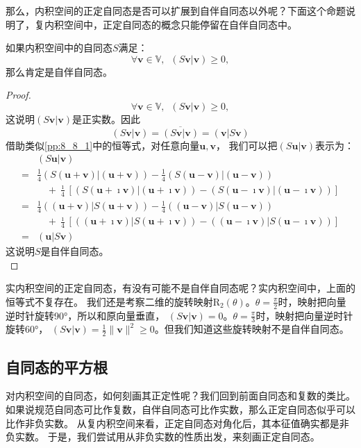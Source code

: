 \documentclass[12pt,UTF8,fontset=none]{ctexbook}
\begin{document}
那么，内积空间的正定自同态是否可以扩展到自伴自同态以外呢？下面这个命题说明了，复内积空间中，正定自同态的概念只能停留在自伴自同态中。
\begin{pp}\label{pp:8_11}
    如果内积空间中的自同态$S$满足：
    $$ \forall \mathbf{v} \in \mathbb{V}, \,\,\, (S\mathbf{v} | \mathbf{v}) \geqslant 0,$$
    那么肯定是自伴自同态。
\end{pp}
\begin{proof} %
    $$ \forall \mathbf{v} \in \mathbb{V}, \,\,\, (S\mathbf{v} | \mathbf{v}) \geqslant 0,$$
    这说明$(S\mathbf{v} | \mathbf{v})$是正实数。因此
    $$ (S\mathbf{v} | \mathbf{v}) = \overline{(S\mathbf{v} | \mathbf{v})} = (\mathbf{v} | S\mathbf{v})$$
    借助类似\ref{pp:8_8_1}中的恒等式，对任意向量$\mathbf{u}, \mathbf{v}$，
    我们可以把$(S\mathbf{u} | \mathbf{v})$表示为：
    \begin{align*}
        &(S\mathbf{u} | \mathbf{v})  \\
        =&\frac14(S(\mathbf{u}+\mathbf{v})|(\mathbf{u}+\mathbf{v})) - \frac14(S(\mathbf{u}-\mathbf{v})|(\mathbf{u}-\mathbf{v}))  \\
        &\quad + \frac{\imath }{4}\left[(S(\mathbf{u}+\imath \mathbf{v})|(\mathbf{u}+\imath \mathbf{v})) - (S(\mathbf{u}-\imath \mathbf{v})|(\mathbf{u}-\imath \mathbf{v}))\right]  \\
        =&\frac14((\mathbf{u}+\mathbf{v})|S(\mathbf{u}+\mathbf{v})) - \frac14((\mathbf{u}-\mathbf{v})|S(\mathbf{u}-\mathbf{v}))  \\
        &\quad + \frac{\imath }{4}\left[((\mathbf{u}+\imath \mathbf{v})|S(\mathbf{u}+\imath \mathbf{v})) - ((\mathbf{u}-\imath \mathbf{v})|S(\mathbf{u}-\imath \mathbf{v}))\right]  \\
        =&(\mathbf{u} | S\mathbf{v}) 
    \end{align*}
    这说明$S$是自伴自同态。\\
\end{proof}

实内积空间的正定自同态，有没有可能不是自伴自同态呢？实内积空间中，上面的恒等式不复存在。
我们还是考察二维的旋转映射$\mathrm{R}_2(\theta)$。$\theta = \frac{\pi}{2}$时，映射把向量逆时针旋转90°，所以和原向量垂直，
$(S\mathbf{v} | \mathbf{v}) = 0$。$\theta = \frac{\pi}{3}$时，映射把向量逆时针旋转60°，
$(S\mathbf{v} | \mathbf{v}) = \frac{1}{2}\|\mathbf{v}\|^2 \geqslant 0$。但我们知道这些旋转映射不是自伴自同态。

\subsection{自同态的平方根}
对内积空间的自同态，如何刻画其正定性呢？我们回到前面自同态和复数的类比。
如果说规范自同态可比作复数，自伴自同态可比作实数，那么正定自同态似乎可以比作非负实数。
从复内积空间来看，正定自同态对角化后，其本征值确实都是非负实数。
于是，我们尝试用从非负实数的性质出发，来刻画正定自同态。
\end{document}

